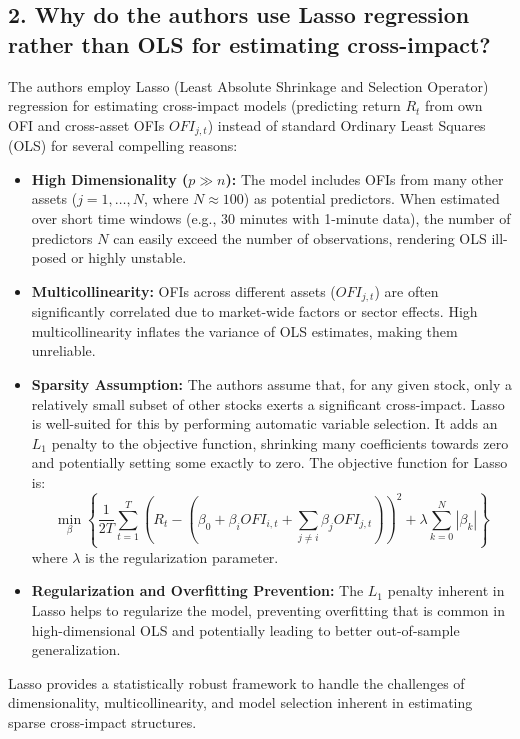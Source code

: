 \documentclass{article}
\begin{document}
\subsection*{2. Why do the authors use Lasso regression rather than OLS for estimating cross-impact?}

The authors employ Lasso (Least Absolute Shrinkage and Selection Operator) regression for estimating cross-impact models (predicting return $R_t$ from own OFI and cross-asset OFIs $OFI_{j,t}$) instead of standard Ordinary Least Squares (OLS) for several compelling reasons:

\begin{itemize}
    \item \textbf{High Dimensionality ($p \gg n$):} The model includes OFIs from many other assets ($j=1, \dots, N$, where $N \approx 100$) as potential predictors. When estimated over short time windows (e.g., 30 minutes with 1-minute data), the number of predictors $N$ can easily exceed the number of observations, rendering OLS ill-posed or highly unstable.
    \item \textbf{Multicollinearity:} OFIs across different assets ($OFI_{j,t}$) are often significantly correlated due to market-wide factors or sector effects. High multicollinearity inflates the variance of OLS estimates, making them unreliable.
    \item \textbf{Sparsity Assumption:} The authors assume that, for any given stock, only a relatively small subset of other stocks exerts a significant cross-impact. Lasso is well-suited for this by performing automatic variable selection. It adds an $L_1$ penalty to the objective function, shrinking many coefficients towards zero and potentially setting some exactly to zero. The objective function for Lasso is:
    \begin{equation} \label{eq:lasso}
        \min_{\beta} \left\{ \frac{1}{2T} \sum_{t=1}^{T} (R_t - (\beta_0 + \beta_i OFI_{i,t} + \sum_{j \neq i} \beta_j OFI_{j,t}))^2 + \lambda \sum_{k=0}^{N} |\beta_k| \right\}
    \end{equation}
    where $\lambda$ is the regularization parameter.
    \item \textbf{Regularization and Overfitting Prevention:} The $L_1$ penalty inherent in Lasso helps to regularize the model, preventing overfitting that is common in high-dimensional OLS and potentially leading to better out-of-sample generalization.
\end{itemize}
Lasso provides a statistically robust framework to handle the challenges of dimensionality, multicollinearity, and model selection inherent in estimating sparse cross-impact structures.
\end{document}
